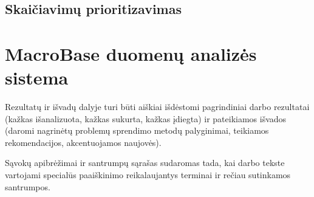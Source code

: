 \documentclass{VUMIFPSkursinis}
\begin{document}
\subsection{Skaičiavimų prioritizavimas} \label{subsec:skaičiavimų}

\section{MacroBase duomenų analizės sistema}


Rezultatų ir išvadų dalyje turi būti aiškiai išdėstomi pagrindiniai darbo
rezultatai (kažkas išanalizuota, kažkas sukurta, kažkas įdiegta) ir pateikiamos
išvados (daromi nagrinėtų problemų sprendimo metodų palyginimai, teikiamos
rekomendacijos, akcentuojamos naujovės).

\printbibliography[heading=bibintoc]

Sąvokų apibrėžimai ir santrumpų sąrašas sudaromas tada, kai darbo tekste
vartojami specialūs paaiškinimo reikalaujantys terminai ir rečiau sutinkamos
santrumpos.

\appendix  %

%
%
\end{document}
